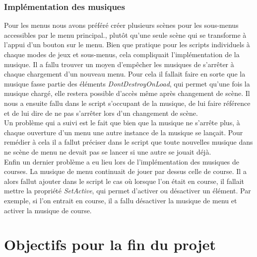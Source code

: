 \documentclass[12pt,a4paper]{article}
\begin{document}
            \subsubsection{Implémentation des musiques}
                Pour les menus nous avons préféré créer plusieurs scènes pour les sous-menus accessibles
                par le menu principal., plutôt qu'une seule scène qui se transforme à l'appui d'un 
                bouton sur le menu.
                Bien que pratique pour les scripts individuels à chaque modes de jeux et sous-menus,
                cela compliquait l'implémentation de la musique. Il a fallu trouver un moyen d'empêcher
                les musiques de s'arrêter à chaque chargement d'un nouveau menu. Pour cela il
                fallait faire en sorte que la musique fasse partie des éléments
                \textsl{DontDestroyOnLoad}, qui permet qu'une fois la musique chargé, elle restera 
                possible d'accès
                même après changement de scène. Il nous a ensuite fallu dans le script s'occupant de la 
                musique, de lui faire référence et de lui dire de ne pas s'arrêter lors d'un changement
                de scène.\\
                Un problème qui a suivi est le fait que bien que la musique ne s'arrête plus, à chaque
                ouverture d'un menu une autre instance de la musique se lançait. Pour remédier à cela il
                a fallut préciser dans le script que toute nouvelles musique dans ne scène de menu ne
                devait pas se lancer si une autre se jouait déjà.\\
                Enfin un dernier problème a eu lieu lors de l'implémentation des musiques de courses. La
                musique de menu continuait de jouer par dessus celle de course. Il a alors fallut
                ajouter dans le script le cas où lorsque l'on était en course, il fallait mettre la 
                propriété \textsl{SetActive}, qui permet d'activer ou désactiver un élément. Par 
                exemple, si l'on entrait en course, il a fallu désactiver la musique de menu et activer 
                la musique de course.


    \clearpage
    \section{Objectifs pour la fin du projet}
\end{document}
